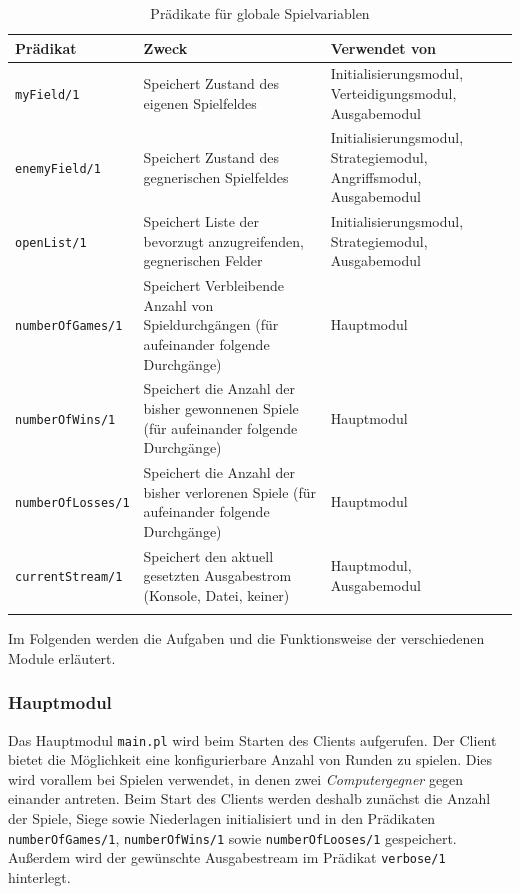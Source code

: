 		\begin{longtable}{|l|p{6cm}|p{5cm}|}
			\hline
			Prädikat & Zweck & Verwendet von \\ 
			\hline 
			\hline \endhead
			\texttt{myField/1} & Speichert Zustand des eigenen Spielfeldes & Initialisierungsmodul, Verteidigungsmodul, Ausgabemodul \\
			\hline
			\texttt{enemyField/1} & Speichert Zustand des gegnerischen Spielfeldes & Initialisierungsmodul, Strategiemodul, Angriffsmodul, Ausgabemodul \\
			\hline
			\texttt{openList/1} & Speichert Liste der bevorzugt anzugreifenden, gegnerischen Felder & Initialisierungsmodul, Strategiemodul, Ausgabemodul \\
			\hline
			\texttt{numberOfGames/1} & Speichert Verbleibende Anzahl von Spieldurchgängen (für aufeinander folgende Durchgänge) & Hauptmodul \\
			\hline
			\texttt{numberOfWins/1} & Speichert die Anzahl der bisher gewonnenen Spiele (für aufeinander folgende Durchgänge) & Hauptmodul \\
			\hline
			\texttt{numberOfLosses/1} & Speichert die Anzahl der bisher verlorenen Spiele (für aufeinander folgende Durchgänge) & Hauptmodul \\
			\hline
			\texttt{currentStream/1} & Speichert den aktuell gesetzten Ausgabestrom (Konsole, Datei, keiner) & Hauptmodul, Ausgabemodul \\
			\hline
		\caption{Prädikate für globale Spielvariablen}
		\label{tbl:globalevariablen}
	\end{longtable}
	
	Im Folgenden werden die Aufgaben und die Funktionsweise der verschiedenen Module erläutert.

\subsubsection{Hauptmodul} \label{sec:hauptmodul}
	Das Hauptmodul \texttt{main.pl} wird beim Starten des Clients aufgerufen. Der Client bietet die Möglichkeit eine konfigurierbare Anzahl
	von Runden zu spielen. Dies wird vorallem bei Spielen verwendet, in denen zwei \textit{Computergegner} gegen einander antreten. 
	Beim Start des Clients werden deshalb zunächst die Anzahl der Spiele, Siege sowie Niederlagen initialisiert und in den Prädikaten
	\texttt{numberOfGames/1}, \texttt{numberOfWins/1} sowie \texttt{numberOfLooses/1} gespeichert. Außerdem wird der gewünschte Ausgabestream
	im Prädikat \texttt{verbose/1} hinterlegt.
	
